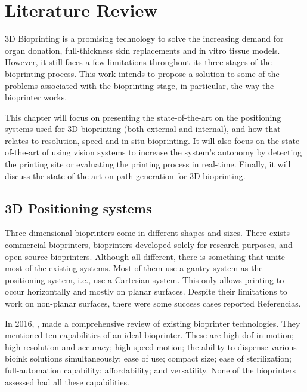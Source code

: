 
\chapter{Literature Review}
\label{cha:literature_review}

3D Bioprinting is a promising technology to solve the increasing demand for organ donation, full-thickness skin replacements and in vitro tissue models. However, it still faces a few limitations throughout its three stages of the bioprinting process. This work intends to propose a solution to some of the problems associated with the bioprinting stage, in particular, the way the bioprinter works.

This chapter will focus on presenting the state-of-the-art on the positioning systems used for 3D bioprinting (both external and internal), and how that relates to resolution, speed and in situ bioprinting. It will also focus on the state-of-the-art of using vision systems to increase the system's autonomy by detecting the printing site or evaluating the printing process in real-time. Finally, it will discuss the state-of-the-art on path generation for 3D bioprinting.


\section{3D Positioning systems}
\label{sec:3d_positioning_systems}

Three dimensional bioprinters come in different shapes and sizes. There exists commercial bioprinters, bioprinters developed solely for research purposes, and open source bioprinters. Although all different, there is something that unite most of the existing systems. Most of them use a gantry system as the positioning system, i.e., use a Cartesian system. This only allows printing to occur horizontally and mostly on planar surfaces. Despite their limitations to work on non-planar surfaces, there were some success cases reported {\color{red} Referencias}.

In 2016, \citeauthor{Ozbolat2017_evaluation_bioprinter_tech}, made a comprehensive review of existing bioprinter technologies. They mentioned ten capabilities of an ideal bioprinter. These are high \gls{dof} in motion; high resolution and accuracy; high speed motion; the ability to dispense various bioink solutions simultaneously; ease of use; compact size; ease of sterilization; full-automation capability; affordability; and versatility. None of the bioprinters assessed had all these capabilities.

